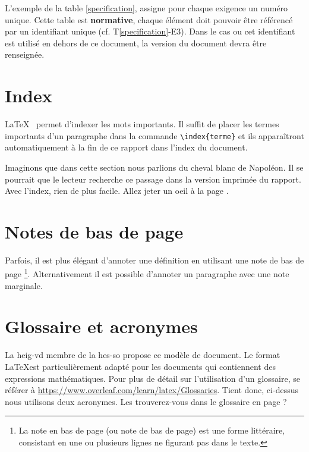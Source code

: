 \documentclass[
    iai, %
    eai, %
]{heig-tb}
\begin{document}
L'exemple de la table \ref{specification}, assigne pour chaque exigence un numéro unique. Cette table est \textbf{normative}, chaque élément doit pouvoir être référencé par un identifiant unique (cf. T\ref{specification}-E3). Dans le cas ou cet identifiant est utilisé en dehors de ce document, la version du document devra être renseignée.

\section{Index}
\LaTeX~ permet d'indexer les mots  importants. Il suffit de placer les termes importants d'un paragraphe dans la commande \texttt{\textbackslash index\{terme\}} et ils apparaîtront automatiquement à la fin de ce rapport dans l'index du document.


Imaginons que dans cette section nous parlions du cheval blanc  de Napoléon. Il se pourrait que le lecteur recherche ce passage dans la version imprimée du rapport. Avec l'index, rien de plus facile. Allez jeter un oeil à la page \pageref{index}.

\section{Notes de bas de page}

 Parfois, il est plus élégant d'annoter une définition en utilisant une note de bas de page \footnote{La note en bas de page (ou note de bas de page) est une forme littéraire, consistant en une ou plusieurs lignes ne figurant pas dans le texte.}. Alternativement il est possible d'annoter un paragraphe avec une note marginale.

\section{Glossaire et acronymes}

La \Gls{heig-vd} membre de la \Gls{hes-so} propose ce modèle de document. Le format \LaTeX est particulièrement adapté pour les documents qui contiennent des expressions mathématiques. Pour plus de détail sur l'utilisation d'un glossaire, se référer à \url{https://www.overleaf.com/learn/latex/Glossaries}. Tient donc, ci-dessus nous utilisons deux acronymes. Les trouverez-vous dans le glossaire en page \pageref{glossaire} ?
\end{document}
